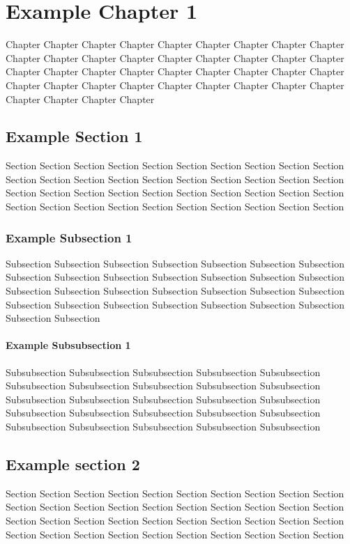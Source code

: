 \chapter{Example Chapter 1}

Chapter Chapter Chapter Chapter Chapter Chapter Chapter Chapter
Chapter Chapter Chapter Chapter Chapter Chapter Chapter Chapter
Chapter Chapter Chapter Chapter Chapter Chapter Chapter Chapter
Chapter Chapter Chapter Chapter Chapter Chapter Chapter Chapter
Chapter Chapter Chapter Chapter Chapter Chapter Chapter Chapter

\section{Example Section 1}

Section Section Section Section Section Section Section Section
Section Section Section Section Section Section Section Section
Section Section Section Section Section Section Section Section
Section Section Section Section Section Section Section Section
Section Section Section Section Section Section Section Section

\subsection{Example Subsection 1}

Subsection Subsection Subsection Subsection Subsection Subsection
Subsection Subsection Subsection Subsection Subsection Subsection
Subsection Subsection Subsection Subsection Subsection Subsection
Subsection Subsection Subsection Subsection Subsection Subsection
Subsection Subsection Subsection Subsection Subsection Subsection

\subsubsection{Example Subsubsection 1}

Subsubsection Subsubsection Subsubsection Subsubsection Subsubsection
Subsubsection Subsubsection Subsubsection Subsubsection Subsubsection
Subsubsection Subsubsection Subsubsection Subsubsection Subsubsection
Subsubsection Subsubsection Subsubsection Subsubsection Subsubsection
Subsubsection Subsubsection Subsubsection Subsubsection Subsubsection

\section{Example section 2}

Section Section Section Section Section Section Section Section
Section Section Section Section Section Section Section Section
Section Section Section Section Section Section Section Section
Section Section Section Section Section Section Section Section
Section Section Section Section Section Section Section Section
